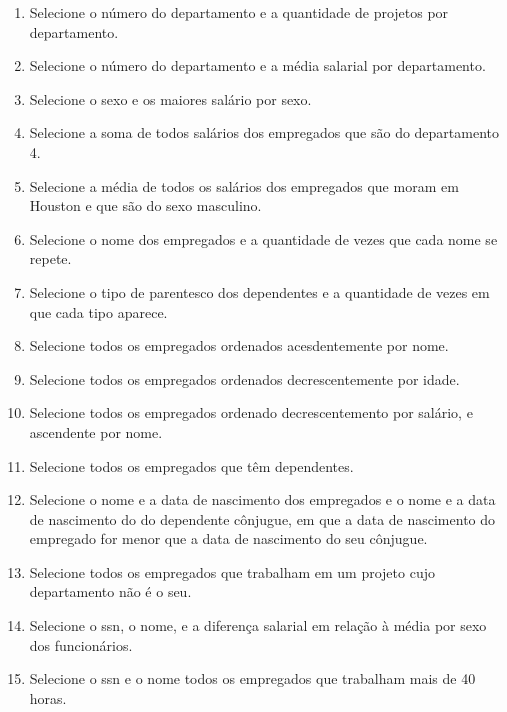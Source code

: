 \documentclass[11pt]{article}
\begin{document}
\begin{enumerate}
		\item Selecione o número do departamento e a quantidade de projetos por departamento.
		
		\item Selecione o número do departamento e a média salarial por departamento.
		
		\item Selecione o sexo e os maiores salário por sexo.
		
		\item Selecione a soma de todos salários dos empregados que são do departamento 4.
		
		\item Selecione a média de todos os salários dos empregados que moram em Houston e que são do sexo masculino.
		
		\item Selecione o nome dos empregados e a quantidade de vezes que cada nome se repete.
		
		\item Selecione o tipo de parentesco dos dependentes e a quantidade de vezes em que cada tipo aparece.
		
		\item Selecione todos os empregados ordenados acesdentemente por nome.
		
		\item Selecione todos os empregados ordenados decrescentemente por idade.
		
		\item Selecione todos os empregados ordenado decrescentemento por salário, e ascendente por nome.

		\item Selecione todos os empregados que têm dependentes.		

		\item Selecione o nome e a data de nascimento dos empregados e o nome e a data de nascimento do
		do dependente cônjugue, em que a data de nascimento do empregado for menor que a data de
		nascimento do seu cônjugue.
		
		\item Selecione todos os empregados que trabalham em um projeto cujo departamento não é o seu.
		
		\item Selecione o ssn, o nome, e a diferença salarial em relação à média por sexo dos funcionários.
		
		\item Selecione o ssn e o nome todos os empregados que trabalham mais de 40 horas.
		

\end{enumerate}
\end{document}
